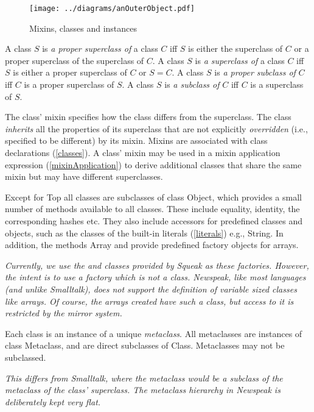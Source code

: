 \documentclass{article}
\newcommand{\code}[1]{{\sf #1}}
\begin{document}
\begin{figure}
\texttt{[image: ../diagrams/anOuterObject.pdf]}
\caption{Mixins, classes and instances}
\label{anOuterObj} 
\end{figure}

A class $S$ is {\em a proper superclass of} a class $C$ iff $S$ is either the superclass of $C$ or  a proper superclass of the superclass of $C$.
A class $S$ is {\em a superclass of} a class $C$ iff $S$ is either a proper superclass of $C$ or $S = C$.
A class $S$ is {\em a proper subclass of} $C$ iff $C$ is a proper superclass of $S$. 
A class $S$ is {\em a subclass of} $C$ iff $C$ is a superclass of $S$.

The class' mixin specifies how the class differs from the superclass. The class {\em inherits} all the properties of its superclass that are not explicitly {\em overridden} (i.e., specified to be different) by its mixin. Mixins are associated with class declarations (\ref{classes}). A class' mixin may be used in a mixin application expression (\ref{mixinApplication}) to derive additional classes that share the same mixin but may have different superclasses.

Except for \code{Top} all classes are subclasses of  class \code{Object}, which provides a small number of methods available to all classes. These include equality, identity, the corresponding hashes etc. They also include accessors for predefined classes and objects, such as the classes of the built-in literals (\ref{literals}) e.g.,  \code{String}. In addition, the methods \code{Array} and  provide predefined factory objects for arrays.

{\it
Currently, we use the  and    classes provided by Squeak as these factories. However, the intent is to use a factory which is not a class. Newspeak, like most languages (and unlike Smalltalk), does not support the definition of variable sized classes like arrays. Of course, the arrays created have such a class, but access to it is restricted by the mirror system.
}

Each class is an instance of a unique {\em metaclass}. All metaclasses are instances of class \code{Metaclass}, and are direct subclasses of \code{Class}. Metaclasses may not be subclassed.

{\it
This differs from Smalltalk, where the metaclass would be a subclass of the metaclass of the class' superclass. The metaclass hierarchy in Newspeak is deliberately kept very flat. 
}
\end{document}
